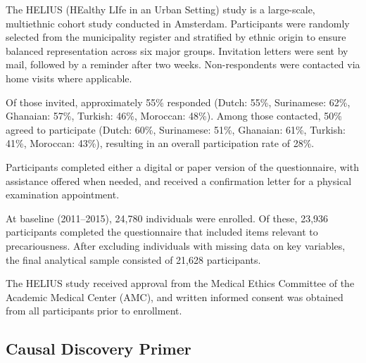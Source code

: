 \documentclass[
]{article}
\begin{document}
The HELIUS (HEalthy LIfe in an Urban Setting) study is a large-scale,
multiethnic cohort study conducted in Amsterdam. Participants were
randomly selected from the municipality register and stratified by
ethnic origin to ensure balanced representation across six major groups.
Invitation letters were sent by mail, followed by a reminder after two
weeks. Non-respondents were contacted via home visits where applicable.

Of those invited, approximately 55\% responded (Dutch: 55\%, Surinamese:
62\%, Ghanaian: 57\%, Turkish: 46\%, Moroccan: 48\%). Among those
contacted, 50\% agreed to participate (Dutch: 60\%, Surinamese: 51\%,
Ghanaian: 61\%, Turkish: 41\%, Moroccan: 43\%), resulting in an overall
participation rate of 28\%.

Participants completed either a digital or paper version of the
questionnaire, with assistance offered when needed, and received a
confirmation letter for a physical examination appointment.

At baseline (2011--2015), 24,780 individuals were enrolled. Of these,
23,936 participants completed the questionnaire that included items
relevant to precariousness. After excluding individuals with missing
data on key variables, the final analytical sample consisted of 21,628
participants.

The HELIUS study received approval from the Medical Ethics Committee of
the Academic Medical Center (AMC), and written informed consent was
obtained from all participants prior to enrollment.

\subsection{Causal Discovery Primer}\label{sec-causalprimer}
\end{document}
